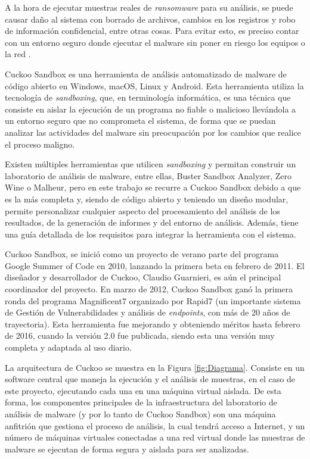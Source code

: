 \noindent A la hora de ejecutar muestras reales de \textit{ransomware} para su análisis, se puede causar daño al sistema con borrado de archivos, cambios en los registros y robo de información confidencial, entre otras cosas. Para evitar esto, es preciso contar con un entorno seguro donde ejecutar el malware sin poner en riesgo los equipos o la red \cite{CMA}.

Cuckoo Sandbox es una herramienta de análisis automatizado de malware de código abierto en Windows, macOS, Linux y Android. Esta herramienta utiliza la tecnología de \textit{sandboxing}, que, en terminología informática, es una técnica que consiste en aislar la ejecución de un programa no fiable o malicioso llevándola a un entorno seguro que no comprometa el sistema, de forma que se puedan analizar las actividades del malware sin preocupación por los cambios que realice el proceso maligno.

Existen múltiples herramientas que utilicen \textit{sandboxing} y permitan construir un laboratorio de análisis de malware, entre ellas, Buster Sandbox Analyzer, Zero Wine o Malheur, pero en este trabajo se recurre a Cuckoo Sandbox debido a que es la más completa y, siendo de código abierto y teniendo un diseño modular, permite personalizar cualquier aspecto del procesamiento del análisis de los resultados, de la generación de informes y del entorno de análisis. Además, tiene una guía detallada de los requisitos para integrar la herramienta con el sistema.

Cuckoo Sandbox, se inició como un proyecto de verano parte del programa Google Summer of Code en 2010, lanzando la primera beta en febrero de 2011. El diseñador y desarrollador de Cuckoo, Claudio Guarnieri, es aún el principal coordinador del proyecto. En marzo de 2012, Cuckoo Sandbox ganó la primera ronda del programa Magnificent7 organizado por Rapid7 (un importante sistema de Gestión de Vulnerabilidades y análisis de \textit{endpoints}, con más  de 20 años de trayectoria). Esta herramienta fue mejorando y obteniendo méritos hasta febrero de 2016, cuando la versión 2.0 fue publicada, siendo esta una versión muy completa y adaptada al uso diario.

La arquitectura de Cuckoo se muestra en la Figura \ref{fig:Diagrama}. Consiste en un software central que maneja la ejecución y el análisis de muestras, en el caso de este proyecto, ejecutando cada una en una máquina virtual aislada. De esta forma, los componentes principales de la infraestructura del laboratorio de análisis de malware (y por lo tanto de Cuckoo Sandbox) son una máquina anfitrión que gestiona el proceso de análisis, la cual tendrá acceso a Internet, y un número de máquinas virtuales conectadas a una red virtual donde las muestras de malware se ejecutan de forma segura y aislada para ser analizadas.

